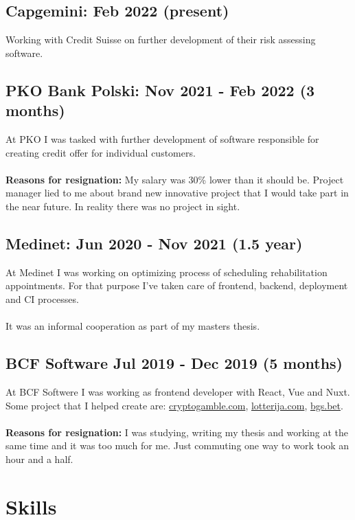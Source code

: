 \documentclass[10pt]{article}
\begin{document}
\subsection{Capgemini: Feb 2022 (present)}
Working with Credit Suisse on further development of their risk assessing software.
\subsection{PKO Bank Polski: Nov 2021 - Feb 2022 (3 months)}
At PKO I was tasked with further development of software responsible for creating credit offer for individual customers.
\\\\
\textbf{Reasons for resignation:} My salary was 30\% lower than it should be. Project manager lied to me about brand new innovative project that I would take part in the near future. In reality there was no project in sight.
\newpage
\subsection{Medinet: Jun 2020 - Nov 2021 (1.5 year)}
At Medinet I was working on optimizing process of scheduling rehabilitation appointments. For that purpose I've taken care of frontend, backend, deployment and CI processes.
\\\\
It was an informal cooperation as part of my masters thesis.
\subsection{BCF Software Jul 2019 - Dec 2019 (5 months) }
At BCF Softwere I was working as frontend developer with React, Vue and Nuxt. Some project that I helped create are:
    \href{https://cryptogamble.com}{cryptogamble.com}, \href{https://lotterija.com}{lotterija.com}, \href{https://bgs.bet}{bgs.bet}.
\\\\
\textbf{Reasons for resignation:} 
I was studying, writing my thesis and working at the same time and it was too much for me. Just commuting one way to work took an hour and a half.
\section{Skills}
\end{document}
